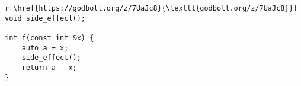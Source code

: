 \begin{lstlisting}r[\href{https://godbolt.org/z/7UaJc8}{\texttt{godbolt.org/z/7UaJc8}}]
void side_effect();

int f(const int &x) {
    auto a = x;
    side_effect();
    return a - x;
}
\end{lstlisting}\n